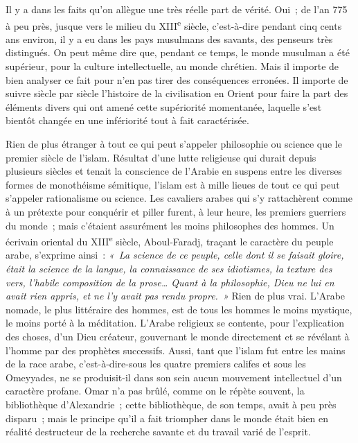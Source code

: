 \documentclass[french,twoside]{book} %
\newcommand\orgName[1]{#1}
\newcommand\persName[1]{#1}
\newcommand\placeName[1]{#1}
\begin{document}
Il y a dans les faits qu’on allègue une très réelle part de vérité. Oui ; de l’an 775 à peu près, jusque vers le milieu du XIII\textsuperscript{e} siècle, c’est-à-dire pendant cinq cents ans environ, il y a eu dans les pays musulmans des savants, des penseurs très distingués. On peut même dire que, pendant ce temps, le monde musulman a été supérieur, pour la culture intellectuelle, au monde chrétien. Mais il importe de bien analyser ce fait pour n’en pas tirer des conséquences erronées. Il importe de suivre siècle par siècle l’histoire de la civilisation en {\placeName Orient} pour faire la part des éléments divers qui ont amené cette supériorité momentanée, laquelle s’est bientôt changée en une infériorité tout à fait caractérisée.\par
Rien de plus étranger à tout ce qui peut s’appeler philosophie ou science que le premier siècle de l’islam. Résultat d’une lutte religieuse qui durait depuis plusieurs siècles et tenait la conscience de l’{\placeName Arabie} en suspens entre les diverses formes de monothéisme sémitique, l’islam est à mille lieues de tout ce qui peut s’appeler rationalisme ou science. Les cavaliers arabes qui s’y rattachèrent comme à un prétexte pour conquérir et piller furent, à leur heure, les premiers guerriers du monde ; mais c’étaient assurément les moins philosophes des hommes. Un écrivain oriental du XIII\textsuperscript{e} siècle, {\persName Aboul-Faradj}, traçant le caractère du peuple arabe, s’exprime ainsi : \emph{« La science de ce peuple, celle dont il se faisait gloire, était la science de la langue, la connaissance de ses idiotismes, la texture des vers, l’habile composition de la prose… Quant à la philosophie, {\persName Dieu} ne lui en avait rien appris, et ne l’y avait pas rendu propre. »} Rien de plus vrai. L’Arabe nomade, le plus littéraire des hommes, est de tous les hommes le moins mystique, le moins porté à la méditation. L’Arabe religieux se contente, pour l’explication des choses, d’un Dieu créateur, gouvernant le monde directement et se révélant à l’homme par des prophètes successifs. Aussi, tant que l’islam fut entre les mains de la race arabe, c’est-à-dire-sous les quatre premiers califes et sous les {\orgName Omeyyades}, ne se produisit-il dans son sein aucun mouvement intellectuel d’un caractère profane. Omar n’a pas brûlé, comme on le répète souvent, la {\orgName bibliothèque d’Alexandrie} ; cette bibliothèque, de son temps, avait à peu près disparu ; mais le principe qu’il a fait triompher dans le monde était bien en réalité destructeur de la recherche savante et du travail varié de l’esprit.\par
\end{document}
